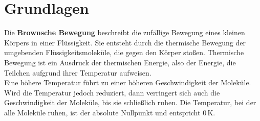 \section*{Grundlagen}

Die \textbf{Brownsche Bewegung} beschreibt die zufällige Bewegung eines kleinen Körpers in einer Flüssigkeit. Sie entsteht durch die thermische Bewegung der umgebenden Flüssigkeitsmoleküle, die gegen den Körper stoßen.
Thermische Bewegung ist ein Ausdruck der thermischen Energie, also der Energie, die Teilchen aufgrund ihrer Temperatur aufweisen.\\
Eine höhere Temperatur führt zu einer höheren Geschwindigkeit der Moleküle. Wird die Temperatur jedoch reduziert, dann verringert sich auch die Geschwindigkeit der Moleküle, bis sie schließlich ruhen. Die Temperatur, bei der alle Moleküle ruhen, ist der absolute Nullpunkt und entspricht $0 \,$K.\\

